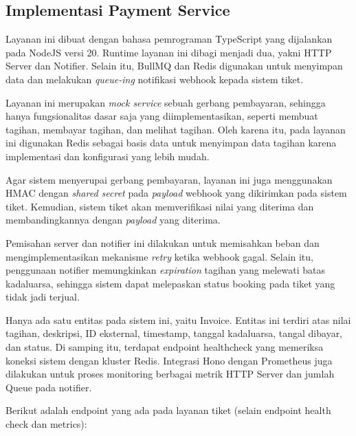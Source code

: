 \subsection{Implementasi Payment Service}

Layanan ini dibuat dengan bahasa pemrograman TypeScript yang dijalankan pada NodeJS versi 20. Runtime layanan ini dibagi menjadi dua, yakni HTTP Server dan Notifier. Selain itu, BullMQ dan Redis digunakan untuk menyimpan data dan melakukan \textit{queue-ing} notifikasi webhook kepada sistem tiket.

Layanan ini merupakan \textit{mock service} sebuah gerbang pembayaran, sehingga hanya fungsionalitas dasar saja yang diimplementasikan, seperti membuat tagihan, membayar tagihan, dan melihat tagihan. Oleh karena itu, pada layanan ini digunakan Redis sebagai basis data untuk menyimpan data tagihan karena implementasi dan konfigurasi yang lebih mudah.

Agar sistem menyerupai gerbang pembayaran, layanan ini juga menggunakan HMAC dengan \textit{shared secret} pada \textit{payload} webhook yang dikirimkan pada sistem tiket. Kemudian, sistem tiket akan memverifikasi nilai yang diterima dan membandingkannya dengan \textit{payload} yang diterima.

Pemisahan server dan notifier ini dilakukan untuk memisahkan beban dan mengimplementasikan mekanisme \textit{retry} ketika webhook gagal. Selain itu, penggunaan notifier memungkinkan \textit{expiration} tagihan yang melewati batas kadaluarsa, sehingga sistem dapat melepaskan status booking pada tiket yang tidak jadi terjual.

Hanya ada satu entitas pada sistem ini, yaitu Invoice. Entitas ini terdiri atas nilai tagihan, deskripsi, ID eksternal, timestamp, tanggal kadaluarsa, tangal dibayar, dan status. Di samping itu, terdapat endpoint healthcheck yang memeriksa koneksi sistem dengan kluster Redis. Integrasi Hono dengan Prometheus juga dilakukan untuk proses monitoring berbagai metrik HTTP Server dan jumlah Queue pada notifier.

Berikut adalah endpoint yang ada pada layanan tiket (selain endpoint health check dan metrics):

